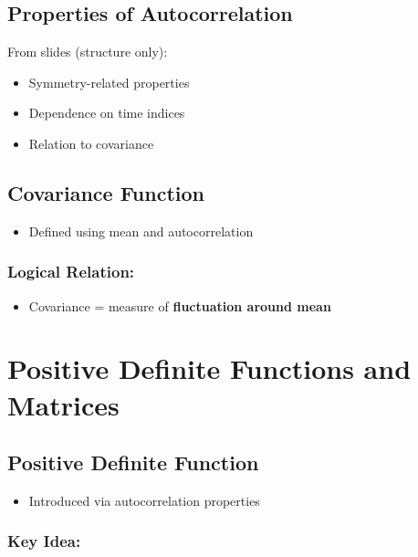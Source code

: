 \documentclass[12pt]{article}
\begin{document}
\subsection{Properties of Autocorrelation}

From slides (structure only):

\begin{itemize}
    \item Symmetry-related properties
    \item Dependence on time indices
    \item Relation to covariance
\end{itemize}

\subsection{Covariance Function}

\begin{itemize}
    \item Defined using mean and autocorrelation
\end{itemize}

\subsubsection*{Logical Relation:}

\begin{itemize}
    \item Covariance = measure of \textbf{fluctuation around mean}
\end{itemize}

\section{Positive Definite Functions and Matrices}

\subsection{Positive Definite Function}

\begin{itemize}
    \item Introduced via autocorrelation properties
\end{itemize}

\subsubsection*{Key Idea:}
\end{document}
